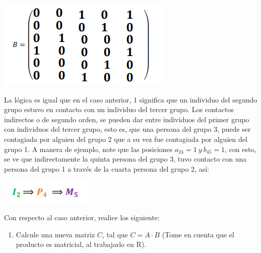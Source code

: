 \documentclass[]{article}
\providecommand{\tightlist}{%
  \setlength{\itemsep}{0pt}\setlength{\parskip}{0pt}}
\begin{document}
\includegraphics{matriz_b.png}

La lógica es igual que en el caso anterior, 1 significa que un individuo
del segundo grupo estuvo en contacto con un individuo del tercer grupo.
Los contactos indirectos o de segundo orden, se pueden dar entre
individuos del primer grupo con individuos del tercer grupo, esto es,
que una persona del grupo 3, puede ser contagiada por alguien del grupo
2 que a su vez fue contagiada por alguien del grupo 1. A manera de
ejemplo, note que las posiciones \(a_{24}=1\ y \ b_{45}=1\), con esto,
se ve que indirectamente la quinta persona del grupo 3, tuvo contacto
con una persona del grupo 1 a través de la cuarta persona del grupo 2,
así:

\includegraphics{arrows.png}

Con respecto al caso anterior, realice los siguiente:

\begin{enumerate}
\def\labelenumi{\alph{enumi}.}
\tightlist
\item
  Calcule una nueva matriz \(C\), tal que \(C=A \cdot B\) (Tome en
  cuenta que el producto es matricial, al trabajarlo en R).
\end{enumerate}
\end{document}
